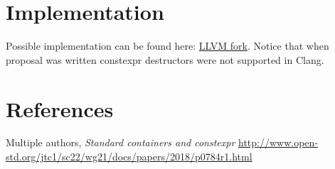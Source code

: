 \documentclass{wg21}
\begin{document}
\section{Implementation}
Possible implementation can be found here: \href{https://github.com/ZaMaZaN4iK/llvm-project/tree/feature/priority_queue_constexpr}{LLVM fork}. Notice that when proposal was written constexpr destructors were not supported in Clang.

\section{References}
\renewcommand{\section}[2]{}%
\begin{thebibliography}{9}

  Multiple authors,
  \emph{Standard containers and constexpr}\newline
  \url{http://www.open-std.org/jtc1/sc22/wg21/docs/papers/2018/p0784r1.html}

\end{thebibliography}
\end{document}
